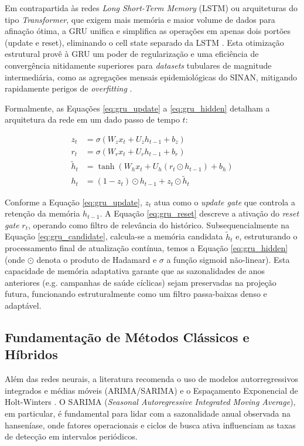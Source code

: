 Em contrapartida às redes \textit{Long Short-Term Memory} (LSTM) ou arquiteturas do tipo \textit{Transformer}, que exigem mais memória e maior volume de dados para afinação ótima, a GRU unifica e simplifica as operações em apenas dois portões (update e reset), eliminando o cell state separado da LSTM \cite{chung2014empirical}. Esta otimização estrutural provê à GRU um poder de regularização e uma eficiência de convergência nitidamente superiores para \textit{datasets} tubulares de magnitude intermediária, como as agregações mensais epidemiológicas do SINAN, mitigando rapidamente perigos de \textit{overfitting} \cite{cho2014gru}.

Formalmente, as Equações \ref{eq:gru_update} a \ref{eq:gru_hidden} detalham a arquitetura da rede em um dado passo de tempo $t$:

\begin{align}
    z_t &= \sigma(W_z x_t + U_z h_{t-1} + b_z) \label{eq:gru_update}\\
    r_t &= \sigma(W_r x_t + U_r h_{t-1} + b_r) \label{eq:gru_reset}\\
    \tilde{h}_t &= \tanh(W_h x_t + U_h (r_t \odot h_{t-1}) + b_h) \label{eq:gru_candidate}\\
    h_t &= (1 - z_t) \odot h_{t-1} + z_t \odot \tilde{h}_t \label{eq:gru_hidden}
\end{align}

Conforme a Equação \ref{eq:gru_update}, $z_t$ atua como o \textit{update gate} que controla a retenção da memória $h_{t-1}$. A Equação \ref{eq:gru_reset} descreve a ativação do \textit{reset gate} $r_t$, operando como filtro de relevância do histórico. Subsequencialmente na Equação \ref{eq:gru_candidate}, calcula-se a memória candidata $\tilde{h}_t$ e, estruturando o processamento final de atualização contínua, temos a Equação \ref{eq:gru_hidden} (onde $\odot$ denota o produto de Hadamard e $\sigma$ a função sigmoid não-linear). Esta capacidade de memória adaptativa garante que as sazonalidades de anos anteriores (e.g. campanhas de saúde cíclicas) sejam preservadas na projeção futura, funcionando estruturalmente como um filtro passa-baixas denso e adaptável.


\subsection{Fundamentação de Métodos Clássicos e Híbridos}

Além das redes neurais, a literatura recomenda o uso de modelos autorregressivos integrados e médias móveis (ARIMA/SARIMA) e o Espaçamento Exponencial de Holt-Winters \cite{hyndman2018forecasting}. O SARIMA (\textit{Seasonal Autoregressive Integrated Moving Average}), em particular, é fundamental para lidar com a sazonalidade anual observada na hanseníase, onde fatores operacionais e ciclos de busca ativa influenciam as taxas de detecção em intervalos periódicos.


